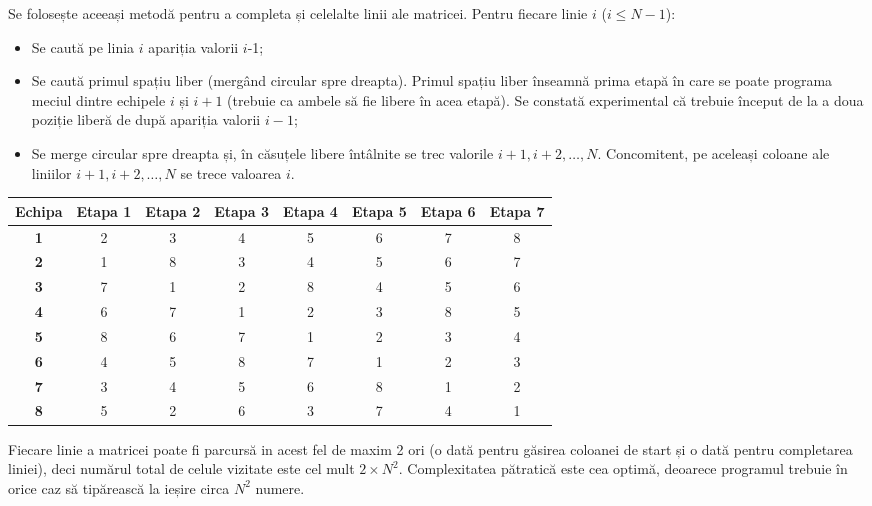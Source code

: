 Se folosește aceeași metodă pentru a completa și celelalte linii ale
matricei. Pentru fiecare linie $i$ ($i \leq N-1$):

\begin{itemize}

\item Se caută pe linia $i$ apariția valorii $i$-1;

\item Se caută primul spațiu liber (mergând circular spre dreapta). Primul
  spațiu liber înseamnă prima etapă în care se poate programa meciul dintre
  echipele $i$ și $i+1$ (trebuie ca ambele să fie libere în acea etapă). Se
  constată experimental că trebuie început de la a doua poziție liberă de după
  apariția valorii $i-1$;

\item Se merge circular spre dreapta și, în căsuțele libere întâlnite se trec
  valorile $i+1, i+2, \dots, N$. Concomitent, pe aceleași coloane ale liniilor
  $i+1, i+2, \dots, N$ se trece valoarea $i$.

\end{itemize}

\begin{table}[H]
  \setlength{\tabcolsep}{5pt}
  \centering
  \begin{tabular}{c|ccccccc}
    \hline
        {\bf Echipa} & {\bf Etapa 1} & {\bf Etapa 2} & {\bf Etapa 3} &
        {\bf Etapa 4} & {\bf Etapa 5} & {\bf Etapa 6} & {\bf Etapa 7} \\ \hline
        {\bf 1} & 2 & 3 & 4 & 5 & 6 & 7 & 8 \\
        {\bf 2} & 1 & 8 & 3 & 4 & 5 & 6 & 7 \\
        {\bf 3} & 7 & 1 & 2 & 8 & 4 & 5 & 6 \\
        {\bf 4} & 6 & 7 & 1 & 2 & 3 & 8 & 5 \\
        {\bf 5} & 8 & 6 & 7 & 1 & 2 & 3 & 4 \\
        {\bf 6} & 4 & 5 & 8 & 7 & 1 & 2 & 3 \\
        {\bf 7} & 3 & 4 & 5 & 6 & 8 & 1 & 2 \\
        {\bf 8} & 5 & 2 & 6 & 3 & 7 & 4 & 1 \\
        \hline
  \end{tabular}
\end{table}

Fiecare linie a matricei poate fi parcursă in acest fel de maxim 2 ori (o dată
pentru găsirea coloanei de start și o dată pentru completarea liniei), deci
numărul total de celule vizitate este cel mult $2 \times N^2$. Complexitatea
pătratică este cea optimă, deoarece programul trebuie în orice caz să
tipărească la ieșire circa $N^2$ numere.

\inputminted{c}{src/problem7.c}
